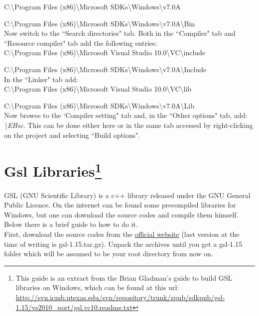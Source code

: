 \documentclass[12pt,a4paper]{report}
\begin{document}
C:\textbackslash Program Files (x86)\textbackslash Microsoft SDKs\textbackslash Windows\textbackslash v7.0A

C:\textbackslash Program Files (x86)\textbackslash Microsoft SDKs\textbackslash Windows\textbackslash v7.0A\textbackslash Bin\\

Now switch to the ``Search directories" tab. Both in the ``Compiler" tab and ``Resource compiler" tab add the following entries:\\

C:\textbackslash Program Files (x86)\textbackslash Microsoft Visual Studio 10.0\textbackslash VC\textbackslash include

C:\textbackslash Program Files (x86)\textbackslash Microsoft SDKs\textbackslash Windows\textbackslash v7.0A\textbackslash Include\\


In the ``Linker" tab add:\\

C:\textbackslash Program Files (x86)\textbackslash Microsoft Visual Studio 10.0\textbackslash VC\textbackslash lib

C:\textbackslash Program Files (x86)\textbackslash Microsoft SDKs\textbackslash Windows\textbackslash v7.0A\textbackslash Lib \\


Now browse to the `Compiler setting" tab and, in the ``Other options" tab, add: \emph{\textbackslash EHsc}. This can be done either here or in the same tab accessed by right-clicking on the project and selecting ``Build options".
\section*{Gsl Libraries\footnote{This guide is an extract from the  Brian Gladman's guide to build GSL libraries on Windows, which can be found at this url: \url{http://svn.icmb.utexas.edu/svn/repository/trunk/zpub/sdkpub/gsl-1.15/vs2010_port/gsl.vc10.readme.txt}}}
GSL (GNU Scientific Library) is a c++ library released under the GNU General Public Licence. On the internet can be found some precompiled libraries for Windows, but one can download the source codes and compile them himself. Below there is a brief guide to how to do it.\\


First, download the source codes from the \href{http://ftpmirror.gnu.org/gsl/}{official website} (last version at the time of writing is gsl-1.15.tar.gz). Unpack the archives until you get a gsl-1.15 folder which will be assumed to be your root directory from now on.\\
\end{document}
